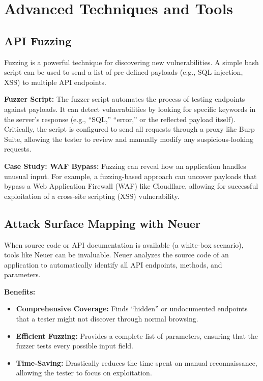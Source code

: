 \documentclass[12pt]{article}
\begin{document}
\section{Advanced Techniques and Tools}

\subsection*{API Fuzzing}
Fuzzing is a powerful technique for discovering new vulnerabilities. A simple bash script can
be used to send a list of pre-defined payloads (e.g., SQL injection, XSS) to multiple API
endpoints.

\textbf{Fuzzer Script:} The fuzzer script automates the process of testing endpoints against payloads.
It can detect vulnerabilities by looking for specific keywords in the server's response (e.g.,
``SQL,'' ``error,'' or the reflected payload itself). Critically, the script is configured to send all
requests through a proxy like Burp Suite, allowing the tester to review and manually modify
any suspicious-looking requests.

\textbf{Case Study: WAF Bypass:} Fuzzing can reveal how an application handles unusual input. For
example, a fuzzing-based approach can uncover payloads that bypass a Web Application
Firewall (WAF) like Cloudflare, allowing for successful exploitation of a cross-site scripting
(XSS) vulnerability.

\subsection*{Attack Surface Mapping with Neuer}
When source code or API documentation is available (a white-box scenario), tools like Neuer
can be invaluable. Neuer analyzes the source code of an application to automatically identify
all API endpoints, methods, and parameters.

\textbf{Benefits:}
\begin{itemize}
  \item \textbf{Comprehensive Coverage:} Finds ``hidden'' or undocumented endpoints that a tester
  might not discover through normal browsing.
  \item \textbf{Efficient Fuzzing:} Provides a complete list of parameters, ensuring that the fuzzer tests
  every possible input field.
  \item \textbf{Time-Saving:} Drastically reduces the time spent on manual reconnaissance, allowing
  the tester to focus on exploitation.
\end{itemize}
\end{document}
